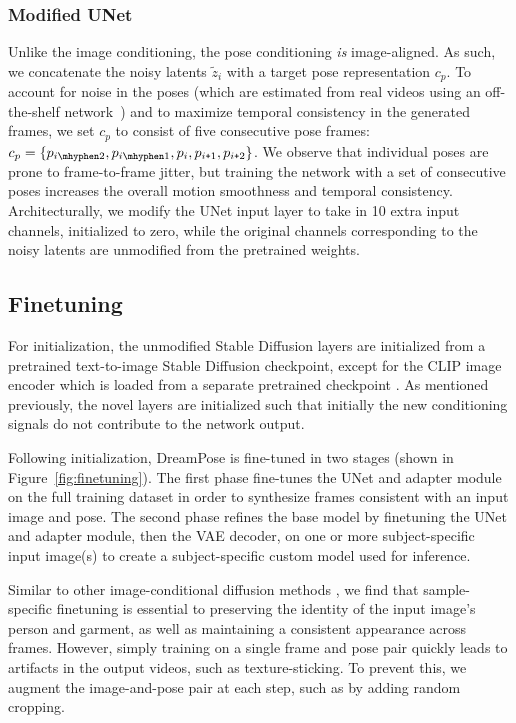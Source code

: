         \subsubsection{Modified UNet} Unlike the image conditioning, the pose conditioning \emph{is} image-aligned. As such, we concatenate the noisy latents $\tilde{z}_i$ with a target pose representation $c_p$. To account for noise in the poses (which are estimated from real videos using an off-the-shelf network~\cite{densepose}) and to maximize temporal consistency in the generated frames, we set $c_p$ to consist of five consecutive pose frames: $c_p = \{p_{i\mhyphen2}, p_{i\mhyphen1}, p_i, p_{i\Plus1}, p_{i\Plus2}\}$. We observe that individual poses are prone to frame-to-frame jitter, but training the network with a set of consecutive poses increases the overall motion smoothness and temporal consistency. Architecturally, we modify the UNet input layer to take in 10 extra input channels, initialized to zero, while the original channels corresponding to the noisy latents are unmodified from the pretrained weights. 
        
    \subsection{Finetuning}    
    \label{sec:ft}
        For initialization, the unmodified Stable Diffusion layers are initialized from a pretrained text-to-image Stable Diffusion checkpoint, except for the CLIP image encoder which is loaded from a separate pretrained checkpoint \cite{stable_diffusion,clip}. As mentioned previously, the novel layers are initialized such that initially the new conditioning signals do not contribute to the network output.
        
        Following initialization, DreamPose is fine-tuned in two stages (shown in Figure~\ref{fig:finetuning}). The first phase fine-tunes the UNet and adapter module on the full training dataset in order to synthesize frames consistent with an input image and pose. The second phase refines the base model by finetuning the UNet and adapter module, then the VAE decoder, on one or more subject-specific input image(s) to create a subject-specific custom model used for inference. 
        
        Similar to other image-conditional diffusion methods \cite{dreambooth,dream_fusion,dreamix}, we find that sample-specific finetuning is essential to preserving the identity of the input image's person and garment, as well as maintaining a consistent appearance across frames. However, simply training on a single frame and pose pair quickly leads to artifacts in the output videos, such as texture-sticking. To prevent this, we augment the image-and-pose pair at each step, such as by adding random cropping.
        
